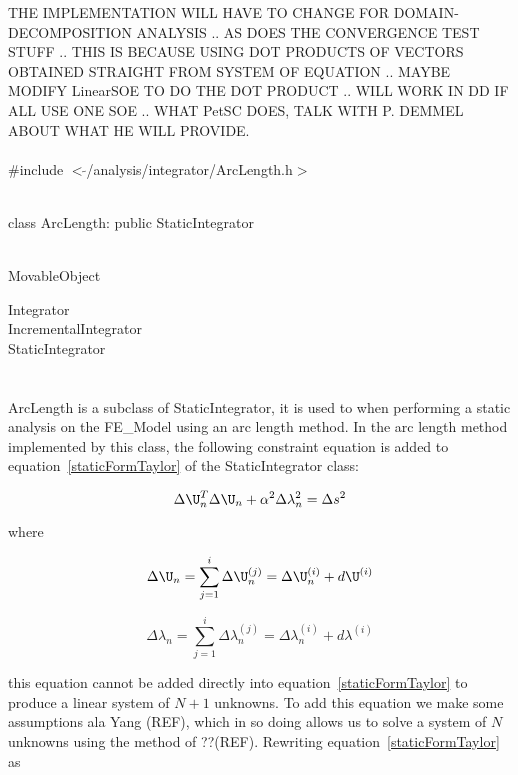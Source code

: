 
THE IMPLEMENTATION WILL HAVE TO CHANGE FOR DOMAIN-DECOMPOSITION
ANALYSIS .. AS DOES THE CONVERGENCE TEST STUFF .. THIS IS BECAUSE
USING DOT PRODUCTS OF VECTORS OBTAINED STRAIGHT FROM SYSTEM OF
EQUATION .. MAYBE MODIFY LinearSOE TO DO THE DOT PRODUCT .. WILL 
WORK IN DD IF ALL USE ONE SOE .. WHAT PetSC DOES, TALK WITH P. DEMMEL
ABOUT WHAT HE WILL PROVIDE. \\

   \\
\#include $<\tilde{ }$/analysis/integrator/ArcLength.h$>$  


  \\
class ArcLength: public StaticIntegrator  


 \\
MovableObject 

\indent\indent Integrator \\
\indent\indent\indent IncrementalIntegrator \\
\indent\indent\indent\indent StaticIntegrator \\
\indent\indent\indent\indent{} \\

 \\ 
\indent ArcLength is a subclass of StaticIntegrator, it is
used to when performing a static analysis on the FE\_Model using an
arc length method. In the arc length method implemented by this class,
the following constraint equation is added to
equation~\ref{staticFormTaylor} of the StaticIntegrator class: 

\begin{equation}
\Delta \U_n^T \Delta \U_n  + \alpha^2 \Delta \lambda_n^2  = \Delta s^2
\end{equation}

where 

$$
\Delta \U_n = \sum_{j=1}^{i} \Delta \U_n^{(j)} = \Delta \U_n^{(i)} +
d\U^{(i)} 
$$


$$
\Delta \lambda_n = \sum_{j=1}^{i} \Delta \lambda_n^{(j)} = \Delta \lambda_n^{(i)} +
d\lambda^{(i)} 
$$


\noindent this equation cannot be added directly into
equation~\ref{staticFormTaylor} to produce a linear system of $N+1$
unknowns. To add this equation we make some assumptions ala Yang
(REF), which in so doing allows us to solve a system of $N$
unknowns using the method of ??(REF).  Rewriting
equation~\ref{staticFormTaylor} as  

